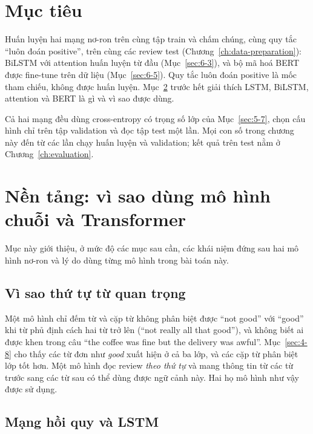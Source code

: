 \section{Mục tiêu}
\label{sec:6-1}

Huấn luyện hai mạng nơ-ron trên cùng tập train và chấm chúng, cùng quy tắc ``luôn đoán positive'', trên cùng các review test (Chương~\ref{ch:data-preparation}): BiLSTM với attention huấn luyện từ đầu (Mục~\ref{sec:6-3}), và bộ mã hoá BERT được fine-tune trên dữ liệu (Mục~\ref{sec:6-5}). Quy tắc luôn đoán positive là mốc tham chiếu, không được huấn luyện. Mục~\ref{sec:6-bg} trước hết giải thích LSTM, BiLSTM, attention và BERT là gì và vì sao được dùng.

Cả hai mạng đều dùng cross-entropy có trọng số lớp của Mục~\ref{sec:5-7}, chọn cấu hình chỉ trên tập validation và đọc tập test một lần. Mọi con số trong chương này đến từ các lần chạy huấn luyện và validation; kết quả trên test nằm ở Chương~\ref{ch:evaluation}.

\section{Nền tảng: vì sao dùng mô hình chuỗi và Transformer}
\label{sec:6-bg}

Mục này giới thiệu, ở mức độ các mục sau cần, các khái niệm đứng sau hai mô hình nơ-ron và lý do dùng từng mô hình trong bài toán này.

\subsection*{Vì sao thứ tự từ quan trọng}

Một mô hình chỉ đếm từ và cặp từ không phân biệt được ``not good'' với ``good'' khi từ phủ định cách hai từ trở lên (``not really all that good''), và không biết ai được khen trong câu ``the coffee was fine but the delivery was awful''. Mục~\ref{sec:4-8} cho thấy các từ đơn như \emph{good} xuất hiện ở cả ba lớp, và các cặp từ phân biệt lớp tốt hơn. Một mô hình đọc review \emph{theo thứ tự} và mang thông tin từ các từ trước sang các từ sau có thể dùng được ngữ cảnh này. Hai họ mô hình như vậy được sử dụng.

\subsection*{Mạng hồi quy và LSTM}

